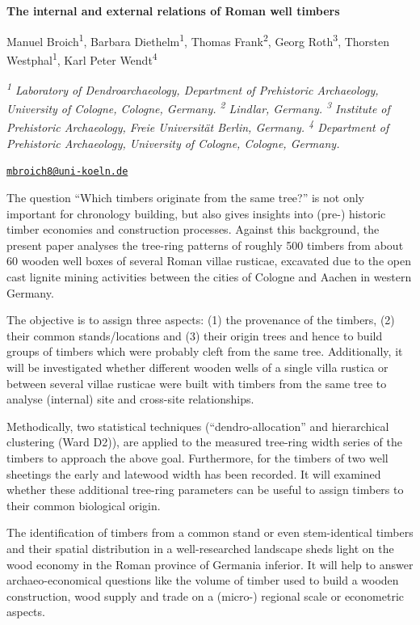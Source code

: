 \documentclass[
]{book}
\begin{document}
\textbf{The internal and external relations of Roman well timbers}

Manuel Broich\textsuperscript{1}, Barbara Diethelm\textsuperscript{1}, Thomas Frank\textsuperscript{2}, Georg Roth\textsuperscript{3}, Thorsten Westphal\textsuperscript{1}, Karl Peter Wendt\textsuperscript{4}

\emph{\textsuperscript{1} Laboratory of Dendroarchaeology, Department of Prehistoric Archaeology, University of Cologne, Cologne, Germany. \textsuperscript{2} Lindlar, Germany. \textsuperscript{3} Institute of Prehistoric Archaeology, Freie Universität Berlin, Germany. \textsuperscript{4} Department of Prehistoric Archaeology, University of Cologne, Cologne, Germany.}

\href{mailto:mbroich8@uni-koeln.de}{\nolinkurl{mbroich8@uni-koeln.de}}

The question ``Which timbers originate from the same tree?'' is not only important for chronology building, but also gives insights into (pre-) historic timber economies and construction processes. Against this background, the present paper analyses the tree-ring patterns of roughly 500 timbers from about 60 wooden well boxes of several Roman villae rusticae, excavated due to the open cast lignite mining activities between the cities of Cologne and Aachen in western Germany.

The objective is to assign three aspects: (1) the provenance of the timbers, (2) their common stands/locations and (3) their origin trees and hence to build groups of timbers which were probably cleft from the same tree. Additionally, it will be investigated whether different wooden wells of a single villa rustica or between several villae rusticae were built with timbers from the same tree to analyse (internal) site and cross-site relationships.

Methodically, two statistical techniques (``dendro-allocation'' and hierarchical clustering (Ward D2)), are applied to the measured tree-ring width series of the timbers to approach the above goal. Furthermore, for the timbers of two well sheetings the early and latewood width has been recorded. It will examined whether these additional tree-ring parameters can be useful to assign timbers to their common biological origin.

The identification of timbers from a common stand or even stem-identical timbers and their spatial distribution in a well-researched landscape sheds light on the wood economy in the Roman province of Germania inferior. It will help to answer archaeo-economical questions like the volume of timber used to build a wooden construction, wood supply and trade on a (micro-) regional scale or econometric aspects.
\end{document}
